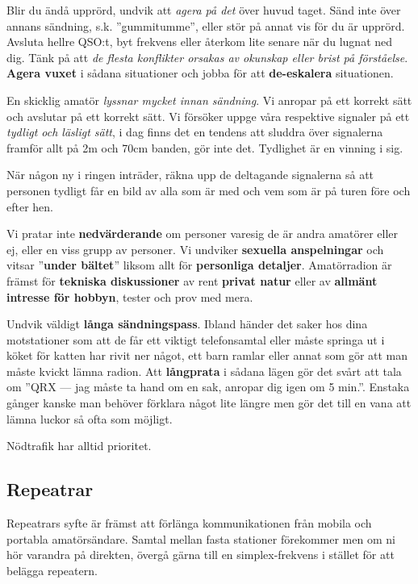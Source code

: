 Blir du ändå upprörd, undvik att \emph{agera på det} över huvud taget. Sänd inte över annans sändning, s.k. ''gummitumme'', eller stör på annat vis för du är upprörd. Avsluta hellre QSO:t, byt frekvens eller återkom lite senare när du lugnat ned dig. Tänk på att \textit{de flesta konflikter orsakas av okunskap eller brist på förståelse}. \textbf{Agera vuxet} i sådana situationer och jobba för att \textbf{de-eskalera} situationen.

En skicklig amatör \textit{lyssnar mycket innan sändning}. Vi anropar på ett korrekt sätt och avslutar på ett korrekt sätt. Vi försöker uppge våra respektive signaler på ett \emph{tydligt och läsligt sätt}, i dag finns det en tendens att sluddra över signalerna framför allt på 2m och 70cm banden, gör inte det. Tydlighet är en vinning i sig. 

När någon ny i ringen inträder, räkna upp de deltagande signalerna så att personen tydligt får en bild av alla som är med och vem som är på turen före och efter hen.

Vi pratar inte \textbf{nedvärderande} om personer varesig de är andra amatörer eller ej, eller en viss grupp av personer. Vi undviker \textbf{sexuella anspelningar} och vitsar ''\textbf{under bältet}'' liksom allt för \textbf{personliga detaljer}. Amatörradion är främst för \textbf{tekniska diskussioner} av rent \textbf{privat natur} eller av \textbf{allmänt intresse för hobbyn}, tester och prov med mera.

Undvik väldigt \textbf{långa sändningspass}. Ibland händer det saker hos dina motstationer som att de får ett viktigt telefonsamtal eller måste springa ut i köket för katten har rivit ner något, ett barn ramlar eller annat som gör att man måste kvickt lämna radion. Att \textbf{långprata} i sådana lägen gör det svårt att tala om ''QRX --- jag måste ta hand om en sak, anropar dig igen om 5 min.''. Enstaka gånger kanske man behöver förklara något lite längre men gör det till en vana att lämna luckor så ofta som möjligt.

Nödtrafik har alltid prioritet.

\subsection{Repeatrar}

Repeatrars syfte är främst att förlänga kommunikationen från mobila och portabla amatörsändare. Samtal mellan fasta stationer förekommer men om ni hör varandra på direkten, övergå gärna till en simplex-frekvens i stället för att belägga repeatern.


